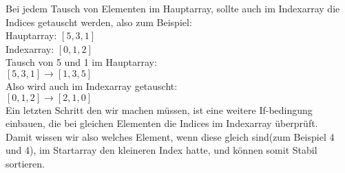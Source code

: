 \documentclass[12pt,a4paper,headsepline]{scrreprt}
\begin{document}
Bei jedem Tausch von Elementen im Hauptarray, sollte auch im Indexarray die Indices getauscht werden, also zum Beispiel:\\
Hauptarray: $[5,3,1]$\\
Indexarray: $[0,1,2]$\\
Tausch von 5 und 1 im Hauptarray:\\
$[5,3,1] \rightarrow [1,3,5]$\\
Also wird auch im Indexarray getauscht:\\
$[0,1,2] \rightarrow [2,1,0]$\\

Ein letzten Schritt den wir machen müssen, ist eine weitere If-bedingung einbauen, die bei gleichen Elementen die Indices im Indexarray überprüft.\\

Damit wissen wir also welches Element, wenn diese gleich sind(zum Beispiel 4 und 4), im Startarray den kleineren Index hatte, und können somit Stabil sortieren.\\
\end{document}
